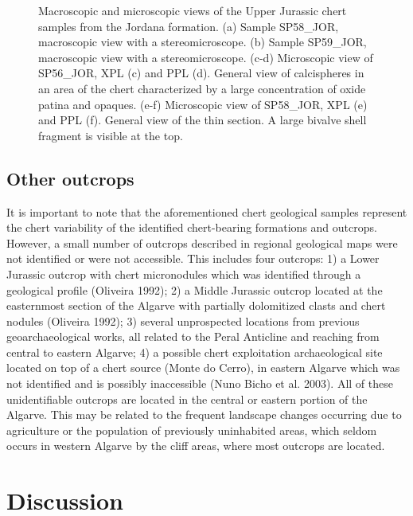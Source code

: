 \documentclass[
  a4paper,
  DIV=11,
  numbers=noendperiod]{scrreprt}
\begin{document}
\begin{figure}


\caption{\label{fig-frames-ujplate}Macroscopic and microscopic views of
the Upper Jurassic chert samples from the Jordana formation. (a) Sample
SP58\_JOR, macroscopic view with a stereomicroscope. (b) Sample
SP59\_JOR, macroscopic view with a stereomicroscope. (c-d) Microscopic
view of SP56\_JOR, XPL (c) and PPL (d). General view of calcispheres in
an area of the chert characterized by a large concentration of oxide
patina and opaques. (e-f) Microscopic view of SP58\_JOR, XPL (e) and PPL
(f). General view of the thin section. A large bivalve shell fragment is
visible at the top.}

\end{figure}%

\subsection{Other outcrops}\label{other-outcrops}

It is important to note that the aforementioned chert geological samples
represent the chert variability of the identified chert-bearing
formations and outcrops. However, a small number of outcrops described
in regional geological maps were not identified or were not accessible.
This includes four outcrops: 1) a Lower Jurassic outcrop with chert
micronodules which was identified through a geological profile (Oliveira
1992); 2) a Middle Jurassic outcrop located at the easternmost section
of the Algarve with partially dolomitized clasts and chert nodules
(Oliveira 1992); 3) several unprospected locations from previous
geoarchaeological works, all related to the Peral Anticline and reaching
from central to eastern Algarve; 4) a possible chert exploitation
archaeological site located on top of a chert source (Monte do Cerro),
in eastern Algarve which was not identified and is possibly inaccessible
(Nuno Bicho et al. 2003). All of these unidentifiable outcrops are
located in the central or eastern portion of the Algarve. This may be
related to the frequent landscape changes occurring due to agriculture
or the population of previously uninhabited areas, which seldom occurs
in western Algarve by the cliff areas, where most outcrops are located.

\section{Discussion}\label{discussion}
\end{document}
